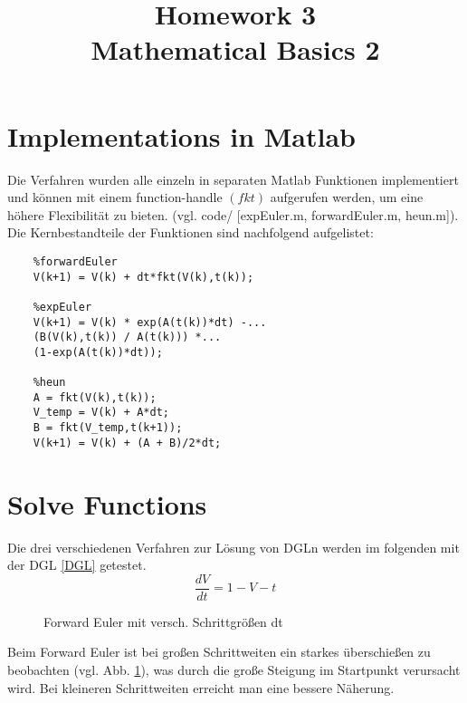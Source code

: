 \documentclass[conference]{IEEEtran}
\begin{document}
%
%
\title{Homework 3\\ Mathematical Basics 2}

\author{
}


\maketitle

\IEEEpeerreviewmaketitle

\section{Implementations in Matlab}
Die Verfahren wurden alle einzeln in separaten Matlab Funktionen implementiert und können mit einem function-handle $(fkt)$ aufgerufen werden, um eine höhere Flexibilität zu bieten. (vgl. code/ [expEuler.m, forwardEuler.m, heun.m]). Die Kernbestandteile der Funktionen sind nachfolgend aufgelistet:

\begin{lstlisting}
	%forwardEuler 	
	V(k+1) = V(k) + dt*fkt(V(k),t(k));
	
	%expEuler		
	V(k+1) = V(k) * exp(A(t(k))*dt) -...
	(B(V(k),t(k)) / A(t(k))) *...
	(1-exp(A(t(k))*dt));
	
	%heun			
	A = fkt(V(k),t(k));
    V_temp = V(k) + A*dt;
    B = fkt(V_temp,t(k+1));
    V(k+1) = V(k) + (A + B)/2*dt;
\end{lstlisting}

\section{Solve Functions}
Die drei verschiedenen Verfahren zur Lösung von DGLn werden im folgenden mit der DGL \eqref{DGL} getestet.
\begin{equation}
\frac{dV}{dt} = 1 - V - t
\label{DGL}
\end{equation}

\begin{figure}[h!]
  	\centering
    \scalebox{.6}{}
    \caption{Forward Euler mit versch. Schrittgrößen dt}
    \label{fig:forwardEuler}
\end{figure}
Beim Forward Euler ist bei großen Schrittweiten ein starkes überschießen zu beobachten (vgl. Abb. \ref{fig:forwardEuler}), was durch die große Steigung im Startpunkt verursacht wird. Bei kleineren Schrittweiten erreicht man eine bessere Näherung.
\end{document}
